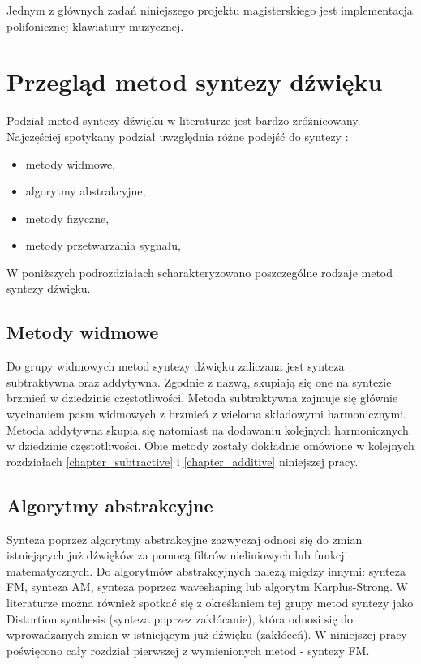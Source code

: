 %
%

Jednym z głównych zadań niniejszego projektu magisterskiego jest implementacja polifonicznej klawiatury muzycznej.



\section{Przegląd metod syntezy dźwięku}
Podział metod syntezy dźwięku w literaturze jest bardzo zróżnicowany. Najczęściej spotykany podział uwzględnia różne podejść do syntezy \cite{metody_syntezy}:
\begin{itemize}
	\item metody widmowe,
	\item algorytmy abstrakcyjne,
	\item metody fizyczne,
	\item metody przetwarzania sygnału,
\end{itemize}

W poniższych podrozdziałach scharakteryzowano poszczególne rodzaje metod syntezy dźwięku.

\subsection{Metody widmowe}
Do grupy widmowych metod syntezy dźwięku zaliczana jest synteza subtraktywna oraz addytywna. Zgodnie z nazwą, skupiają się one na syntezie brzmień w dziedzinie częstotliwości. Metoda subtraktywna zajmuje się głównie wycinaniem pasm widmowych z brzmień z wieloma składowymi harmonicznymi. Metoda addytywna skupia się natomiast na dodawaniu kolejnych harmonicznych w dziedzinie częstotliwości. Obie metody zostały dokładnie omówione w kolejnych rozdziałach \ref{chapter_subtractive} i \ref{chapter_additive} niniejszej pracy.

\subsection{Algorytmy abstrakcyjne}
Synteza poprzez algorytmy abstrakcyjne zazwyczaj odnosi się do zmian istniejących już dźwięków za pomocą filtrów nieliniowych lub funkcji matematycznych. Do algorytmów abstrakcyjnych należą między innymi: synteza FM, synteza AM, synteza poprzez waveshaping lub algorytm Karplus-Strong. W literaturze można również spotkać się z określaniem tej grupy metod syntezy jako Distortion synthesis (synteza poprzez zakłócanie), która odnosi się do wprowadzanych zmian w istniejącym już dźwięku (zakłóceń). W niniejszej pracy poświęcono cały rozdział pierwszej z wymienionych metod - syntezy FM.


